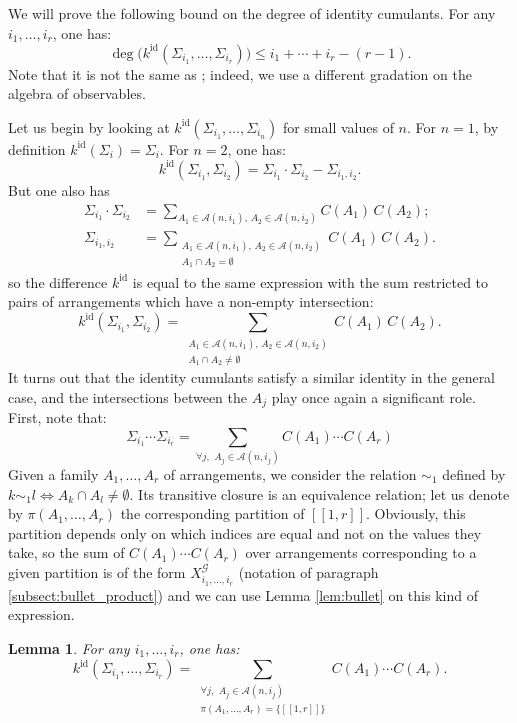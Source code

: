 \documentclass[10pt]{amsart}
\newtheorem{lemma}[theorem]{Lemma}
\theoremstyle{remark}
\newcommand{\Arr}{\mathcal{A}}
\newcommand{\lle}{\left[\!\left[}
\newcommand{\rre}{\right]\!\right]}
\newcommand{\id}{\mathrm{id}}
\begin{document}
We will prove the following bound on the degree of identity cumulants. For any $i_1,\ldots,i_r$, one has:
\begin{equation}\label{eq:major_deg_kid}
\deg\big(k^{\id}(\Sigma_{i_1},\ldots,\Sigma_{i_r})\big) \leq i_1 + \cdots + i_r - (r-1).
\end{equation}
Note that it is not the same as \cite[Theorem 4.3]{Sniady06}; indeed, we use a different gradation on the algebra of observables.\bigskip

Let us begin by looking at $k^{\id}(\varSigma_{i_1},\ldots,\varSigma_{i_n})$ for small values of $n$.
For $n=1$, by definition $k^{\id}(\varSigma_{i})=\varSigma_i$. For $n=2$, one has:
$$k^{\id}(\varSigma_{i_1},\varSigma_{i_2})=\varSigma_{i_1} \cdot \varSigma_{i_2} - \varSigma_{i_1,i_2}.$$
But one also has
\begin{align*}
 \varSigma_{i_1} \cdot \varSigma_{i_2} &=\sum_{ A_1\in \Arr(n,i_1),\,A_2 \in \Arr(n,i_2)} C(A_1) \, C(A_2) ;\\
\varSigma_{i_1,i_2} &= \sum_{\substack{ A_1\in \Arr(n,i_1),\,A_2 \in \Arr(n,i_2)\\ A_1 \cap A_2 = \emptyset}} C(A_1)\, C(A_2).
\end{align*}
so the difference $k^{\id}$ is equal to the same expression with the sum restricted to pairs of arrangements which have a non-empty intersection:
$$k^{\id}(\varSigma_{i_1},\varSigma_{i_2} )=\sum_{ \substack{A_1\in\Arr(n,i_1),\,A_2 \in \Arr(n,i_2)\\ A_1 \cap A_2 \neq \emptyset}} C(A_1)\, C(A_2).$$
It turns out that the identity cumulants satisfy a similar identity in the general case, and the intersections between the $A_j$ play once again a significant role. First, note that:
$$\varSigma_{i_1} \cdots  \varSigma_{i_r} =\sum_{ \forall j,\,\,A_j \in \Arr(n,i_j)} C(A_1) \cdots C(A_r)$$
Given a family $A_1,\ldots,A_r$ of arrangements, we consider the relation $\sim_1$ defined by $k \sim_1 l \Leftrightarrow A_k \cap A_l \neq \emptyset$. Its transitive closure is an equivalence relation; let us denote by $\pi(A_1,\ldots,A_r)$ the corresponding partition of $\lle 1,r\rre$. Obviously, this partition depends only on which indices are equal and not on the values they take, so the sum of $C(A_1) \cdots C(A_r)$ over arrangements corresponding to a given partition is of the form $X_{i_1,\dots,i_r}^{\mathcal{G}}$ (notation of paragraph \ref{subsect:bullet_product}) and we can use Lemma \ref{lem:bullet} on this kind of expression.

\begin{lemma}
For any $i_1,\ldots,i_r$, one has:
$$k^{\id}(\varSigma_{i_1},\ldots,\varSigma_{i_r}) = \sum_{ \substack{\forall j,\,\,A_j \in \Arr(n,i_j) \\  \pi(A_1,\ldots,A_r)=\{\lle 1,r\rre\}       }} C(A_1) \cdots C(A_r).$$
\end{lemma}
\end{document}
